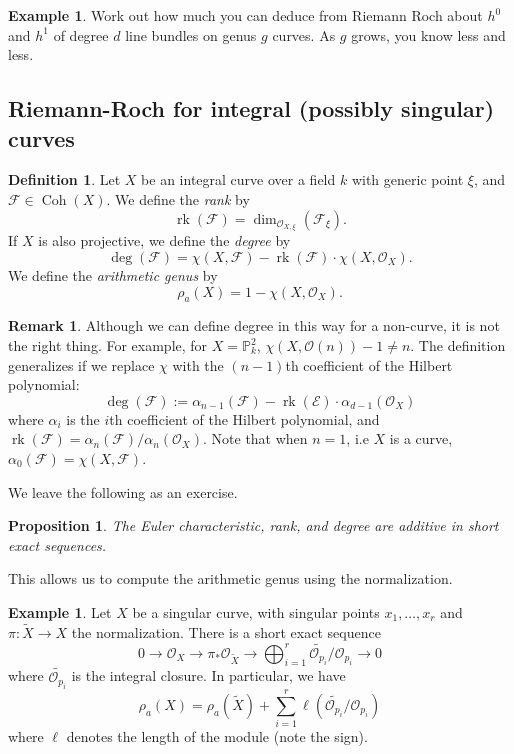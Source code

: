 \documentclass[10pt]{article}
\newtheorem{prop}[thm]{Proposition}
\theoremstyle{definition}
\newtheorem{exmp}[thm]{Example}
\newtheorem{defn}[thm]{Definition}
\newtheorem{rmk}[thm]{Remark}
\DeclareMathOperator{\Coh}{Coh}
\DeclareMathOperator{\rk}{rk}
\newcommand{\PP}{\mathbb{P}}
\newcommand{\OO}{\mathcal{O}}
\newcommand{\todo}[1]{\textbf{\textcolor{red}{TODO #1}}}
\begin{document}
\begin{exmp}
Work out how much you can deduce from Riemann Roch about $h^0$ and $h^1$ of degree $d$ line bundles on genus $g$ curves.  As $g$ grows, you know less and less.
\end{exmp}

\subsection{Riemann-Roch for integral (possibly singular) curves}


\begin{defn}
Let $X$ be an integral curve over a field $k$ with generic point $\xi$, and $\mathcal{F} \in \Coh(X)$.  We define the \emph{rank} by
$$\rk(\mathcal{F}) = \dim_{\OO_{X, \xi}}(\mathcal{F}_\xi).$$
If $X$ is also projective, we define the \emph{degree} by 
$$\deg(\mathcal{F}) = \chi(X, \mathcal{F}) - \rk(\mathcal{F}) \cdot \chi(X, \OO_X).$$
We define the \emph{arithmetic genus} by
$$\rho_a(X) = 1 - \chi(X, \OO_X).$$
\end{defn}

\begin{rmk}
Although we can define degree in this way for a non-curve, it is not the right thing.  For example, for $X = \PP^2_k$, $\chi(X, \OO(n)) - 1 \neq n$.  The definition generalizes if we replace $\chi$ with the $(n-1)$th coefficient of the Hilbert polynomial:
$$\deg(\mathcal{F}) := \alpha_{n-1}(\mathcal{F}) - \rk(\mathcal{E}) \cdot \alpha_{d-1}(\OO_X)$$
where $\alpha_i$ is the $i$th coefficient of the Hilbert polynomial, and $\rk(\mathcal{F}) = \alpha_n(\mathcal{F})/\alpha_n(\OO_X)$.  Note that when $n=1$, i.e $X$ is a curve, $\alpha_0(\mathcal{F}) = \chi(X, \mathcal{F})$.  %
\end{rmk}

We leave the following as an exercise.
\begin{prop}
The Euler characteristic, rank, and degree are additive in short exact sequences.
\end{prop}

This allows us to compute the arithmetic genus using the normalization.
\begin{exmp}
Let $X$ be a singular curve, with singular points $x_1, \ldots, x_r$ and $\pi: \tilde{X} \rightarrow X$ the normalization.  There is a short exact sequence
$$0 \rightarrow \mathcal{O}_X \rightarrow \pi_* \mathcal{O}_{\widetilde{X}} \rightarrow \bigoplus_{i=1}^r \tilde{\OO_{p_i}}/\OO_{p_i} \rightarrow 0$$
where $\widetilde{\OO_{p_i}}$ is the integral closure.  In particular, we have
$$\rho_a(X) = \rho_a(\tilde{X}) + \sum_{i=1}^r \ell(\tilde{\OO_{p_i}}/\OO_{p_i})$$
where $\ell$ denotes the length of the module (note the sign).
\end{exmp}
\end{document}
